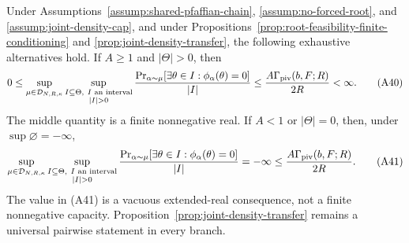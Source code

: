 \begin{proposition}
\label{prop:ordered-suprema}
Under Assumptions~\ref{assump:shared-pfaffian-chain},
\ref{assump:no-forced-root}, and \ref{assump:joint-density-cap}, and under
Propositions~\ref{prop:root-feasibility-finite-conditioning} and
\ref{prop:joint-density-transfer}, the following exhaustive alternatives
hold.  If $A\geq1$ and $|\Theta|>0$, then
\[
0\leq
\sup_{\mu\in\mathcal D_{N,R,\kappa}}
\sup_{\substack{I\subseteq\Theta,\ I\text{ an interval}\\|I|>0}}
\frac{\Pr_{\alpha\sim\mu}[\exists\theta\in I:
\phi_\alpha(\theta)=0]}{|I|}
\leq\frac{A\Gamma_{\rm piv}(b,F;R)}{2R}<\infty.
\tag{A40}
\]
The middle quantity is a finite nonnegative real.  If $A<1$ or
$|\Theta|=0$, then, under $\sup\varnothing=-\infty$,
\[
\sup_{\mu\in\mathcal D_{N,R,\kappa}}
\sup_{\substack{I\subseteq\Theta,\ I\text{ an interval}\\|I|>0}}
\frac{\Pr_{\alpha\sim\mu}[\exists\theta\in I:
\phi_\alpha(\theta)=0]}{|I|}
=-\infty
\leq\frac{A\Gamma_{\rm piv}(b,F;R)}{2R}.
\tag{A41}
\]
The value in \textup{(A41)} is a vacuous extended-real consequence, not a
finite nonnegative capacity.  Proposition~\ref{prop:joint-density-transfer}
remains a universal pairwise statement in every branch.
\end{proposition}

